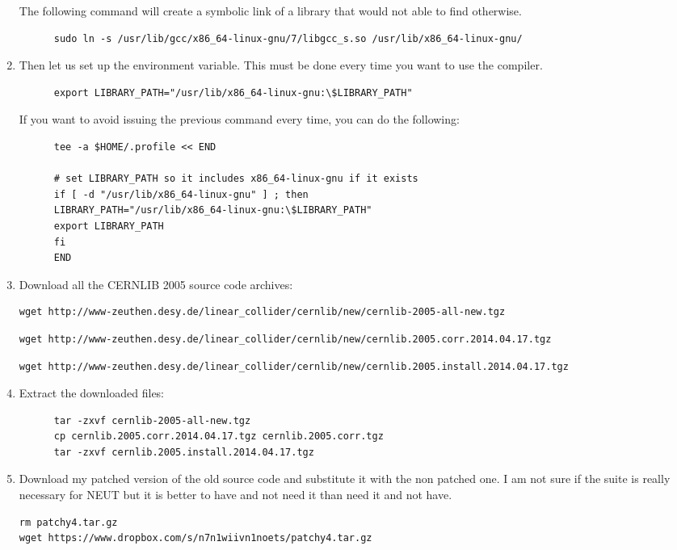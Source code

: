 \begin{enumerate}[resume]
  The following command will create a symbolic link of a library that
   would not able to find otherwise.
\begin{lstlisting}
      sudo ln -s /usr/lib/gcc/x86_64-linux-gnu/7/libgcc_s.so /usr/lib/x86_64-linux-gnu/
\end{lstlisting}
\item Then let us set up the  environment
  variable. This must be done every time you want to use the 
  compiler.
\begin{lstlisting}
      export LIBRARY_PATH="/usr/lib/x86_64-linux-gnu:\$LIBRARY_PATH"
\end{lstlisting}
  If you want to avoid issuing the previous command every time, you can do the
  following:
\begin{lstlisting}
      tee -a $HOME/.profile << END

      # set LIBRARY_PATH so it includes x86_64-linux-gnu if it exists
      if [ -d "/usr/lib/x86_64-linux-gnu" ] ; then
      LIBRARY_PATH="/usr/lib/x86_64-linux-gnu:\$LIBRARY_PATH"
      export LIBRARY_PATH
      fi
      END
\end{lstlisting}
  
\item Download all the CERNLIB 2005 source code archives:%
\begin{lstlisting}
wget http://www-zeuthen.desy.de/linear_collider/cernlib/new/cernlib-2005-all-new.tgz
\end{lstlisting}
\begin{lstlisting}
wget http://www-zeuthen.desy.de/linear_collider/cernlib/new/cernlib.2005.corr.2014.04.17.tgz
\end{lstlisting}
\begin{lstlisting}
wget http://www-zeuthen.desy.de/linear_collider/cernlib/new/cernlib.2005.install.2014.04.17.tgz
\end{lstlisting}
\item Extract the downloaded files:
\begin{lstlisting}
      tar -zxvf cernlib-2005-all-new.tgz
      cp cernlib.2005.corr.2014.04.17.tgz cernlib.2005.corr.tgz
      tar -zxvf cernlib.2005.install.2014.04.17.tgz
\end{lstlisting}

\item Download my patched version of the old  source code
  and substitute it with the non patched one. I am not sure if the
   suite is really necessary for NEUT but it is better to
  have and not need it than need it and not have.
\begin{lstlisting}
rm patchy4.tar.gz
wget https://www.dropbox.com/s/n7n1wiivn1noets/patchy4.tar.gz
\end{lstlisting}


\end{enumerate}
